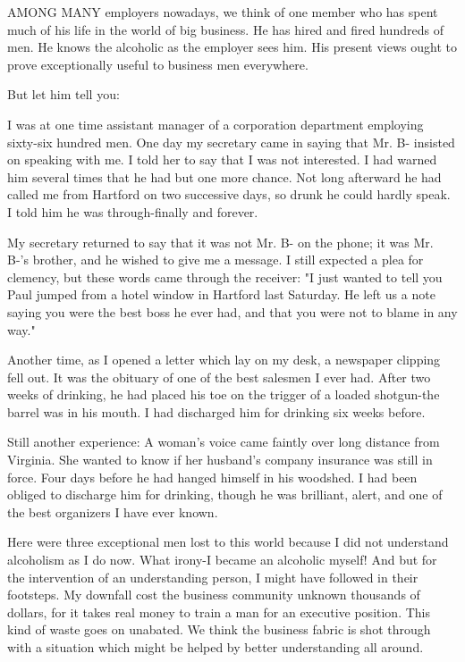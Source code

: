 
\bbChapterPreamble


\begin{biblechapter}

AMONG MANY employers nowadays, we think of one member who has spent much of his life in the world of big business.  He has hired and fired hundreds of men.  He knows the alcoholic as the employer sees him.  His present views ought to prove exceptionally useful to business men everywhere. 

But let him tell you:

I was at one time assistant manager of a corporation department employing sixty-six hundred men.  One day my secretary came in saying that Mr. B- insisted on speaking with me.  I told her to say that I was not interested.  I had warned him several times that he had but one more chance.  Not long afterward he had called me from Hartford on two successive days, so drunk he could hardly speak.  I told him he was through-finally and forever.

My secretary returned to say that it was not Mr. B- on the phone; it was Mr. B-'s brother, and he wished to give me a message.  I still expected a plea for clemency, but these words came through the receiver:  "I just wanted to tell you Paul jumped from a hotel window in Hartford last Saturday.  He left us a note saying you were the best boss he ever had, and that you were not to blame in any way."

Another time, as I opened a letter which lay on my desk, a newspaper clipping fell out.  It was the obituary of one of the best salesmen I ever had.  After two weeks of drinking, he had placed his toe on the trigger of a loaded shotgun-the barrel was in his mouth.  I had discharged him for drinking six weeks before.

Still another experience:  A woman's voice came faintly over long distance from Virginia.  She wanted to know if her husband's company insurance was still in force.  Four days before he had hanged himself in his woodshed.  I had been obliged to discharge him for drinking, though he was brilliant, alert, and one of the best organizers I have ever known.

Here were three exceptional men lost to this world because I did not understand alcoholism as I do now.  What irony-I became an alcoholic myself!  And but for the intervention of an understanding person, I might have followed in their footsteps.  My downfall cost the business community unknown thousands of dollars, for it takes real money to train a man for an executive position.  This kind of waste goes on unabated.  We think the business fabric is shot through with a situation which might be helped by better understanding all around. 


\end{biblechapter}
